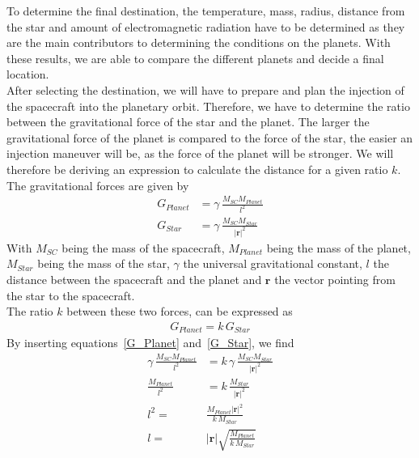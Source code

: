 \documentclass[reprint,english,notitlepage]{revtex4-2}
\begin{document}
To determine the final destination, the temperature, mass, radius, distance from the star and amount of electromagnetic radiation have to be determined as they are the main contributors to determining the conditions on the planets.
With these results, we are able to compare the different planets and decide a final location.\\

After selecting the destination, we will have to prepare and plan the injection of the spacecraft into the planetary orbit.
Therefore, we have to determine the ratio between the gravitational force of the star and the planet.
The larger the gravitational force of the planet is compared to the force of the star, the easier an injection maneuver will be, as the force of the planet will be stronger.
We will therefore be deriving an expression to calculate the distance for a given ratio $k$.
The gravitational forces are given by
\begin{align}
    G_{Planet} &= \gamma \, \frac{M_{SC}M_{Planet}}{l^2} \label{G_Planet}\\
	G_{Star} &= \gamma \, \frac{M_{SC}M_{Star}}{|\textbf{r}|^2} \label{G_Star}
\end{align}
With $M_{SC}$ being the mass of the spacecraft, $M_{Planet}$ being the mass of the planet, $M_{Star}$ being the mass of the star, $\gamma$ the universal gravitational constant, $l$ the distance between the spacecraft and the planet and $\textbf{r}$ the vector pointing from the star to the spacecraft.\\
The ratio $k$ between these two forces, can be expressed as
\begin{align*}
    G_{Planet} = k\, G_{Star}
\end{align*}
By inserting equations~\eqref{G_Planet} and~\eqref{G_Star}, we find
\begin{align*}
    \gamma \, \frac{M_{SC}M_{Planet}}{l^2} &= k\, \gamma \, \frac{M_{SC}M_{Star}}{|\textbf{r}|^2}\\
	\frac{M_{Planet}}{l^2} &= k\, \frac{M_{Star}}{|\textbf{r}|^2}\\
	l^2 =& \frac{M_{Planet}|\textbf{r}|^2}{k\,M_{Star}}\\
	l =& |\textbf{r}|\sqrt{\frac{M_{Planet}}{k\,M_{Star}}}
\end{align*}\\
\end{document}
